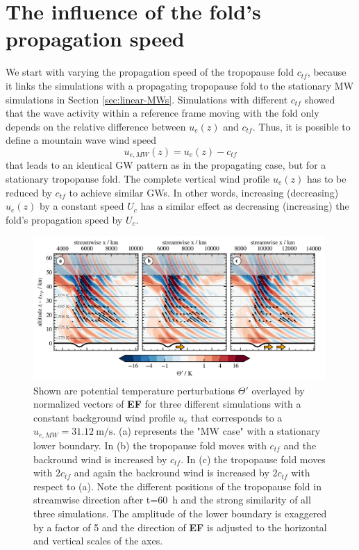 \section{The influence of the fold's propagation speed}
\label{sec:q3D-speed}
We start with varying the propagation speed of the tropopause fold $c_{tf}$, because it links the simulations with a propagating tropopause fold to the stationary MW simulations in Section \ref{sec:linear-MWs}. Simulations with different $c_{tf}$ showed that the wave activity within a reference frame moving with the fold only depends on the relative difference between $u_e(z)$ and $c_{tf}$. Thus, it is possible to define a mountain wave wind speed
\begin{equation}
    u_{e,MW}(z) = u_e(z)-c_{tf}
    \label{equ:MW_forcing}
\end{equation}
that leads to an identical GW pattern as in the propagating case, but for a stationary tropopause fold. The complete vertical wind profile $u_e(z)$ has to be reduced by $c_{tf}$ to achieve similar GWs. In other words, increasing (decreasing) $u_e(z)$ by a constant speed $U_c$ has a similar effect as decreasing (increasing) the fold's propagation speed by $U_c$.
\begin{figure}[t]
    \centering
    \includegraphics[width=0.99\textwidth]{figures_q3D/Q3D-TH-EF-ctropo.png}
    \caption{Shown are potential temperature perturbations $\Theta'$ overlayed by normalized vectors of \textbf{EF} for three different simulations with a constant background wind profile $u_e$ that corresponds to a $u_{e,MW}=\SI{31.12}{\meter\per\second}$. (a) represents the "MW case" with a stationary lower boundary. In (b) the tropopause fold moves with $c_{tf}$ and the backround wind is increased by $c_{tf}$. In (c) the tropopause fold moves with $2c_{tf}$ and again the backround wind is increased by $2c_{tf}$ with respect to (a). Note the different positions of the tropopause fold in streamwise direction after t=\SI{60}{\hour} and the strong similarity of all three simulations. The amplitude of the lower boundary is exaggered by a factor of 5 and the direction of \textbf{EF} is adjusted to the horizontal and vertical scales of the axes.}
    \label{fig:q3D_ctropo}
\end{figure}

